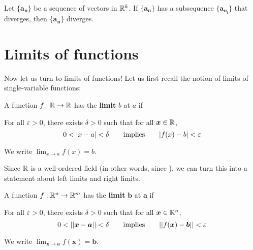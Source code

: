 \begin{theorem}\label{divergencecriteria}
Let $\{\bm{a_n}\}$ be a sequence of vectors in $\mathbb{R}^k$.  If $\{\bm{a_n}\}$ has a subsequence $\{\bm{a_{n_i}}\}$ that diverges, then $\{\bm{a_n}\}$ diverges.

\end{theorem}







\section{Limits of functions}




Now let us turn to limits of functions!  Let us first recall the notion of limits of single-variable functions:


\begin{definition}
    A function $f :\mathbb{R} \to \mathbb{R}$ has the \textbf{limit} $b$ at $a$ if
    
    \vspace{1em}
    For all $\varepsilon>0$, there exists $\delta > 0$ such that for all $\bm{x} \in \mathbb{R}$, $$0 < |x-a| < \delta \qquad \textnormal{implies} \qquad |f(x) - b | < \varepsilon$$
    
    We write $\lim_{x \to a}f(x) = b$.
    
    \end{definition}


Since $\mathbb{R}$ is a well-ordered field (in other words, since ), we can turn this into a statement about left limits and right limits.










\begin{definition}
    A function $f : \mathbb{R}^n \to \mathbb{R}^m$ has the \textbf{limit} $\bm{b}$ at $\bm{a}$ if
    
    \vspace{1em}
    For all $\varepsilon>0$, there exists $\delta > 0$ such that for all $\bm{x} \in \mathbb{R}^n$, $$0 < ||\bm{x} - \bm{a} || < \delta \qquad \textnormal{implies} \qquad ||f(\bm{x}) - \bm{b} || < \varepsilon$$
    
    We write $\lim_{\bm{x} \to \bm{a}}f(\bm{x}) = \bm{b}$.
    
    \end{definition}


